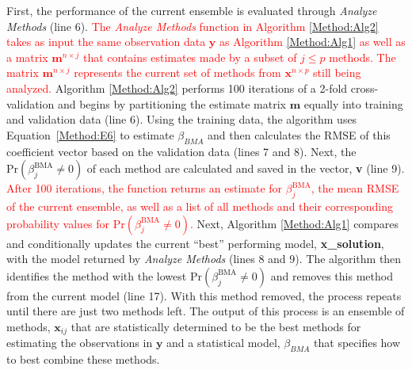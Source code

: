 \documentclass[journal=jpcbfk, manuscript=article]{achemso}
\newcommand{\+}[1]{\ensuremath{\mathbf{#1}}}
\newcommand{\rev}[1]{\textsf{\textcolor{red}{#1}}}
\begin{document}
First, the performance of the current ensemble is evaluated through \emph{Analyze Methods} (line 6).
\rev{The \emph{Analyze Methods} function in Algorithm \ref{Method:Alg2} takes as input the same observation data $\textbf{y}$ as Algorithm \ref{Method:Alg1} as well as a matrix  $\textbf{m}^{n \times j}$ that contains estimates made by a subset of $j \leq p$ methods.
The matrix $\textbf{m}^{n \times j}$ represents the current set of methods from $\textbf{x}^{n \times p}$ still being analyzed.}
Algorithm \ref{Method:Alg2} performs 100 iterations of a 2-fold cross-validation and begins by partitioning the estimate matrix $\mathbf{m}$ equally into training and validation data (line 6).
Using the training data, the algorithm uses Equation~\ref{Method:E6} to estimate $\beta_{BMA}$ and then calculates the RMSE of this coefficient vector based on the validation data (lines 7 and 8).
Next, the $\mathrm{Pr}(\beta_j^{\text{BMA}}\neq 0)$ of each method are calculated and saved in the vector, \textbf{v} (line 9).
\rev{After 100 iterations, the function returns an estimate for $\beta_j^{\text{BMA}}$, the mean RMSE of the current ensemble, as well as a list of all methods and their corresponding probability values for $\mathrm{Pr}(\beta_j^{\text{BMA}}\neq 0)$.}
Next, Algorithm \ref{Method:Alg1} compares and conditionally updates the current ``best'' performing model, \textbf{x\_solution}, with the model returned by \emph{Analyze Methods} (lines 8 and 9).
The algorithm then identifies the method with the lowest $\mathrm{Pr} (\beta_j^{\text{BMA}}\neq 0)$ and removes this method from the current model (line 17). With this method removed, the process repeats until there are just two methods left.
The output of this process is an ensemble of methods, $\textbf{x}_{ij}$ that are statistically determined to be the best methods for estimating the observations in $\mathbf{y}$ and a statistical model, $\beta_{BMA}$ that specifies how to best combine these methods.  
\end{document}

